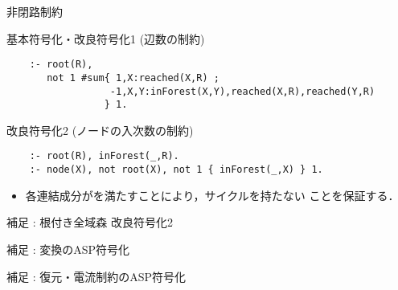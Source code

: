 \begin{frame}[fragile]{非閉路制約}
\begin{minipage}[c]{1.01\textwidth}
\begin{exampleblock}{基本符号化・改良符号化1 (辺数の制約)}\small
\begin{lstlisting}
    :- root(R),
       not 1 #sum{ 1,X:reached(X,R) ;
                  -1,X,Y:inForest(X,Y),reached(X,R),reached(Y,R)
                 } 1.
\end{lstlisting}
\end{exampleblock}
\begin{exampleblock}{改良符号化2 (ノードの入次数の制約)}\small
\begin{lstlisting}
    :- root(R), inForest(_,R).
    :- node(X), not root(X), not 1 { inForest(_,X) } 1.
\end{lstlisting}
\end{exampleblock}
\end{minipage}
\vfill
\begin{itemize}
\item 各連結成分がを満たすことにより，サイクルを持たない
	  ことを保証する．
\end{itemize}
\end{frame}

\begin{frame}[fragile]{補足 : 根付き全域森 改良符号化2}

\end{frame}

\begin{frame}[fragile]{補足 : 変換のASP符号化}

\end{frame}

\begin{frame}[fragile]{補足 : 復元・電流制約のASP符号化}

\end{frame}


